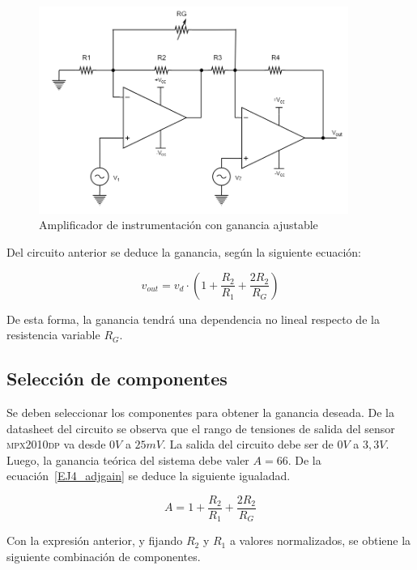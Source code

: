 \begin{figure}[H]
    \centering
    \includegraphics[width=0.9\textwidth]{../EJ4/resources/instrumental_2opamp_adjgain.png}
	\caption{Amplificador de instrumentaci\'on con ganancia ajustable}
   	\label{fig:EJ4_2opamp_adjgain}
\end{figure}

Del circuito anterior se deduce la ganancia, seg\'un la siguiente ecuaci\'on:

\begin{equation}
v_{out} = v_d \cdot \left( 1+\frac{R_2}{R_1}+\frac{2R_2}{R_G} \right)
\label{EJ4_adjgain}
\end{equation}

De esta forma, la ganancia tendr\'a una dependencia no lineal respecto de la resistencia variable $R_G$.

\subsection{Selecci\'on de componentes}

Se deben seleccionar los componentes para obtener la ganancia deseada. De la datasheet del circuito se observa que el rango de tensiones de salida del sensor \textsc{mpx2010dp} va desde $0V$ a $25mV$. La salida del circuito debe ser de $0V$ a $3,3V$. Luego, la ganancia te\'orica del sistema debe valer $A = 66$. De la ecuaci\'on~\ref{EJ4_adjgain} se deduce la siguiente igualadad.


\begin{equation}
A = 1+\frac{R_2}{R_1}+\frac{2R_2}{R_G}
\end{equation}

Con la expresi\'on anterior, y fijando $R_2$ y $R_1$ a valores normalizados, se obtiene la siguiente combinaci\'on de componentes.

